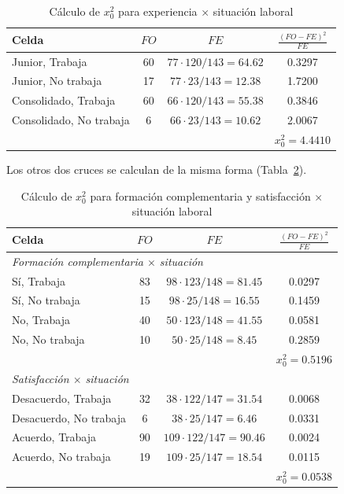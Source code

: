 \documentclass[12pt, a4paper]{article}
\newenvironment{mitabla}[2][H]{%
  \begin{table}[#1]
  \centering
  \caption{#2}
  \small
}{%
  \end{table}
}
\begin{document}
\begin{mitabla}{Cálculo de $x_0^2$ para experiencia $\times$ situación laboral}\label{tab:real-chi}
\begin{tabular}{lccc}
\toprule
\textbf{Celda} & \textbf{$FO$} & \textbf{$FE$} & \textbf{$\frac{(FO-FE)^2}{FE}$} \\
\midrule
Junior, Trabaja         & 60 & $77 \cdot 120/143 = 64.62$ & 0.3297 \\
Junior, No trabaja      & 17 & $77 \cdot 23/143 = 12.38$  & 1.7200 \\
Consolidado, Trabaja    & 60 & $66 \cdot 120/143 = 55.38$ & 0.3846 \\
Consolidado, No trabaja & 6  & $66 \cdot 23/143 = 10.62$  & 2.0067 \\
\midrule
 & & & $x_0^2 = 4.4410$ \\
\bottomrule
\end{tabular}
\end{mitabla}

Los otros dos cruces se calculan de la misma forma
(Tabla~\ref{tab:real-chi-otros}).

\begin{mitabla}{Cálculo de $x_0^2$ para formación complementaria y satisfacción $\times$ situación laboral}\label{tab:real-chi-otros}
\begin{tabular}{lccc}
\toprule
\textbf{Celda} & \textbf{$FO$} & \textbf{$FE$} & \textbf{$\frac{(FO-FE)^2}{FE}$} \\
\midrule
\multicolumn{4}{l}{\textit{Formación complementaria $\times$ situación}} \\
Sí, Trabaja    & 83 & $98 \cdot 123/148 = 81.45$ & 0.0297 \\
Sí, No trabaja & 15 & $98 \cdot 25/148 = 16.55$  & 0.1459 \\
No, Trabaja    & 40 & $50 \cdot 123/148 = 41.55$ & 0.0581 \\
No, No trabaja & 10 & $50 \cdot 25/148 = 8.45$   & 0.2859 \\
 & & & $x_0^2 = 0.5196$ \\
\midrule
\multicolumn{4}{l}{\textit{Satisfacción $\times$ situación}} \\
Desacuerdo, Trabaja    & 32 & $38 \cdot 122/147 = 31.54$  & 0.0068 \\
Desacuerdo, No trabaja & 6  & $38 \cdot 25/147 = 6.46$    & 0.0331 \\
Acuerdo, Trabaja       & 90 & $109 \cdot 122/147 = 90.46$ & 0.0024 \\
Acuerdo, No trabaja    & 19 & $109 \cdot 25/147 = 18.54$  & 0.0115 \\
 & & & $x_0^2 = 0.0538$ \\
\bottomrule
\end{tabular}
\end{mitabla}
\end{document}
